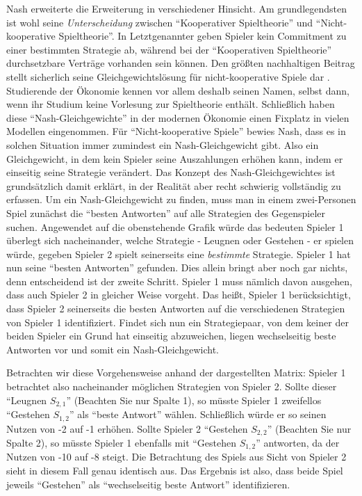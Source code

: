 Nash erweiterte die Erweiterung in verschiedener Hinsicht. Am grundlegendsten ist wohl seine \textit{Unterscheidung} zwischen "`Kooperativer Spieltheorie"' und "`Nicht-kooperative Spieltheorie"'. In Letztgenannter geben Spieler kein Commitment zu einer bestimmten Strategie ab, während bei der "`Kooperativen Spieltheorie"' durchsetzbare Verträge vorhanden sein können.
Den größten nachhaltigen Beitrag stellt sicherlich seine Gleichgewichtslösung für nicht-kooperative Spiele dar \parencite{Nash1951, Nash1950b}. Studierende der Ökonomie kennen vor allem deshalb seinen Namen, selbst dann, wenn ihr Studium keine Vorlesung zur Spieltheorie enthält. Schließlich haben diese "`Nash-Gleichgewichte"' in der modernen Ökonomie einen Fixplatz in vielen Modellen eingenommen. Für "`Nicht-kooperative Spiele"' bewies Nash, dass es in solchen Situation immer zumindest ein Nash-Gleichgewicht gibt. Also ein Gleichgewicht, in dem kein Spieler seine Auszahlungen erhöhen kann, indem er einseitig seine Strategie verändert. Das Konzept des Nash-Gleichgewichtes ist grundsätzlich damit erklärt, in der Realität aber recht schwierig vollständig zu erfassen. Um ein Nash-Gleichgewicht zu finden, muss man in einem zwei-Personen Spiel zunächst die "`besten Antworten"' auf alle Strategien des Gegenspieler suchen. Angewendet auf die obenstehende Grafik würde das bedeuten Spieler 1 überlegt sich nacheinander, welche Strategie - Leugnen oder Gestehen - er spielen würde, gegeben Spieler 2 spielt seinerseits eine \textit{bestimmte} Strategie. Spieler 1 hat nun seine "`besten Antworten"' gefunden. Dies allein bringt aber noch gar nichts, denn entscheidend ist der zweite Schritt. Spieler 1 muss nämlich davon ausgehen, dass auch Spieler 2 in gleicher Weise vorgeht. Das heißt, Spieler 1 berücksichtigt, dass Spieler 2 seinerseits die besten Antworten auf die verschiedenen Strategien von Spieler 1 identifiziert. Findet sich nun ein Strategiepaar, von dem keiner der beiden Spieler ein Grund hat einseitig abzuweichen, liegen wechselseitig beste Antworten vor und somit ein Nash-Gleichgewicht.

Betrachten wir diese Vorgehensweise anhand der dargestellten Matrix: Spieler 1 betrachtet also nacheinander möglichen Strategien von Spieler 2. Sollte dieser "`Leugnen $S_{2,1}$"' (Beachten Sie nur Spalte 1), so müsste Spieler 1 zweifellos "`Gestehen $S_{1,2}$"' als "`beste Antwort"' wählen. Schließlich würde er so seinen Nutzen von -2 auf -1 erhöhen. Sollte Spieler 2 "`Gestehen $S_{2,2}$"' (Beachten Sie nur Spalte 2), so müsste Spieler 1 ebenfalls mit "`Gestehen $S_{1,2}$"' antworten, da der Nutzen von -10 auf -8 steigt. Die Betrachtung des Spiels aus Sicht von Spieler 2 sieht in diesem Fall genau identisch aus. Das Ergebnis ist also, dass beide Spiel jeweils "`Gestehen"' als "`wechselseitig beste Antwort"' identifizieren. 

